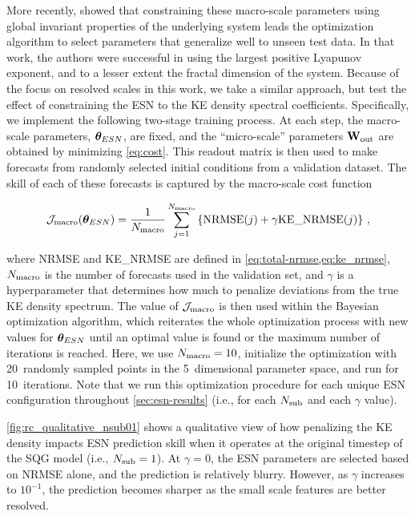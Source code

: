 More recently, 
showed that constraining these macro-scale
parameters using global invariant properties of the underlying system leads the
optimization algorithm to select parameters that generalize well to unseen test data. In that work, the authors were successful in using the largest positive
Lyapunov exponent, and to a lesser extent the fractal dimension of the system.
Because of the focus on resolved scales in this work, we take a similar approach, but test the effect of constraining the ESN to the KE density spectral coefficients.
Specifically, we implement the following two-stage training process.
At each step, the macro-scale parameters, $\bm{\theta}_{ESN}$, are fixed, and the
``micro-scale'' parameters $\mathbf{W}_\text{out}$ are obtained by minimizing \cref{eq:cost}.
This readout matrix is then used to make forecasts from randomly selected
initial conditions from a validation dataset.
The skill of each of these forecasts is captured by the macro-scale cost
function
\begin{linenomath*}\begin{equation}
    \mathcal{J}_\text{macro}(\bm{\theta}_{ESN}) = \dfrac{1}{N_\text{macro}}
    \sum_{j=1}^{N_\text{macro}}
    \left\{
        \text{NRMSE}(j) + \gamma \text{KE\_NRMSE}(j)
    \right\}
    \label{eq:macro-cost} \, ,
\end{equation}\end{linenomath*}
where NRMSE and KE\_NRMSE are defined in \cref{eq:total-nrmse,eq:ke_nrmse},
$N_\text{macro}$ is the number of forecasts used in the validation set, and $\gamma$ is
a hyperparameter that determines how much to penalize deviations
from the true KE density spectrum.
The value of $\mathcal{J}_\text{macro}$ is then used within the Bayesian optimization algorithm, which reiterates the whole optimization process with new values for
$\bm{\theta}_{ESN}$ until an optimal value is found or the maximum number of iterations is reached.
Here, we use $N_\text{macro}=10$, initialize the optimization with 20~randomly sampled points in the 5~dimensional parameter space, and run for 10~iterations. Note that we run this optimization procedure for each unique ESN configuration
throughout \cref{sec:esn-results} (i.e., for each $N_\text{sub}$ and each $\gamma$
value).

\cref{fig:rc_qualitative_nsub01} shows a qualitative view of how penalizing the
KE density impacts ESN prediction skill when it operates at the original
timestep of the SQG model (i.e., $N_\text{sub}=1$).
At $\gamma=0$, the ESN parameters are selected based on NRMSE alone, and
the prediction is relatively blurry.
However, as $\gamma$ increases to $10^{-1}$, the prediction becomes sharper as
the small scale features are better resolved.

